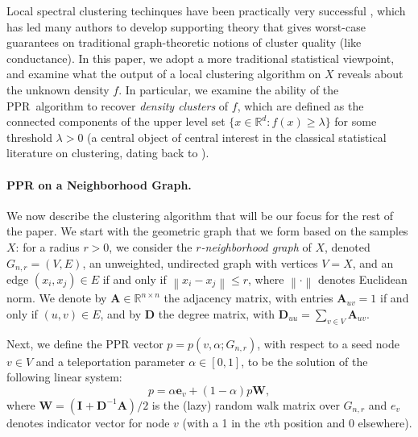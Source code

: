 \documentclass{article}
\newcommand{\Reals}{\mathbb{R}}
\newcommand{\Rd}{\Reals^d}
\newcommand{\norm}[1]{\left\lVert#1\right\rVert}
\newcommand{\1}{\mathbf{1}}
\newcommand{\pbf}{p}        %
\newcommand{\ebf}[1]{\mathbf{e}_{#1}}
\newcommand{\Abf}{\mathbf{A}}
\newcommand{\Xbf}{X}             %
\newcommand{\Wbf}{\mathbf{W}}
\newcommand{\Dbf}{\mathbf{D}}
\newcommand{\Ibf}[1]{\mathbf{I}_{#1}}
\newcommand{\pprspace}{{\sc PPR~}}
\theoremstyle{aldenthm}
\theoremstyle{aldenrmrk}
\begin{document}
Local spectral clustering techinques have been practically very successful
\citep{leskovec2010,andersen2012,gleich2012,mahoney2012,wu2012}, which has led
many authors to develop supporting theory
\citep{spielman2013,andersen2009,gharan2012,zhu2013} that gives worst-case
guarantees on traditional graph-theoretic notions of cluster quality (like
conductance).  In this paper, we adopt a more traditional statistical viewpoint,
and examine what the output of a local clustering algorithm on $\Xbf$ reveals
about the unknown density $f$.  In particular, we examine the ability of the \pprspace algorithm to recover \emph{density clusters} of $f$, which are defined as the
connected components of the upper level set $\{x \in \Rd : f(x) \geq \lambda\}$
for some threshold $\lambda > 0$ (a central object of central interest in the
classical statistical literature on clustering, dating back to
\citet{hartigan1981}).

\paragraph{PPR on a Neighborhood Graph.}We now describe the clustering algorithm that will be our focus for the rest of 
the paper. We start with the geometric graph that we form based on the samples 
$\Xbf$: for a radius $r > 0$, we consider the \emph{$r$-neighborhood graph} of 
$\Xbf$, denoted $G_{n,r}=(V,E)$, an unweighted, undirected graph with vertices
$V=\Xbf$, and an edge $(x_i,x_j) \in E$ if and only if $\norm{x_i - x_j}
\leq  r$, where $\norm{\cdot}$ denotes Euclidean norm. We denote by $\Abf \in \Reals^{n \times n}$ the adjacency matrix, with entries $\Abf_{uv} = 1$ if and only if $(u,v) \in E$, and by $\Dbf$ the degree matrix, with $\Dbf_{uu} = \sum_{v \in V} \Abf_{uv}$.

Next, we define the PPR vector $\pbf = \pbf(v,\alpha;G_{n,r})$, with respect to  
a seed node $v \in V$ and a teleportation parameter $\alpha \in [0,1]$, to be
the solution of the following linear system:
\begin{equation}
\label{eqn: ppr_vector}
\pbf = \alpha \ebf{v} + (1 - \alpha) \pbf \Wbf,
\end{equation}
where $\Wbf = (\Ibf{} + \Dbf^{-1}\Abf)/2$ is the (lazy) random walk matrix over $G_{n,r}$ 
and $e_{v}$ denotes indicator vector for node $v$ (with a 1 in the $v$th
position and 0 elsewhere).
\end{document}
